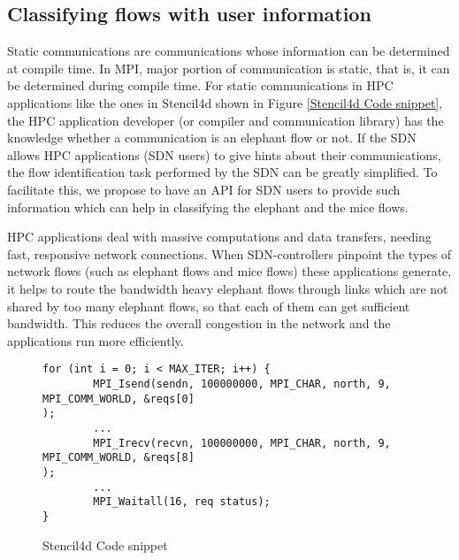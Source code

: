  

\subsection{Classifying flows with user information}
Static communications are communications whose
information can be determined at compile time. In MPI, major portion of
communication is static, that is, it can be determined during compile time. 
For static communications in HPC applications like the ones in Stencil4d 
shown in Figure \ref{Stencil4d Code snippet}, 
the HPC application developer (or compiler and communication library) 
has the knowledge whether a communication is an elephant flow or not. 
If the SDN allows HPC applications (SDN users) to give hints about 
their communications, the flow identification task performed by the 
SDN can be greatly simplified. To facilitate this, we propose to have 
an API for SDN users to provide such information which can help in 
classifying the elephant and the mice flows.
\begin{comment} 
The most complete information about a point-to-point communication i
ncludes the source MPI rank, the destination rank, and the message size. 
Based on the information the users can give the hint when the 
application is loaded (when MPI ranks are mapped to physical nodes).
\end{comment}



HPC applications deal with massive computations and data transfers, 
needing fast, responsive network connections. When SDN-controllers
pinpoint the types of network flows (such as elephant flows and mice flows) 
these applications generate, it helps to route the bandwidth heavy elephant flows
 through links which are not shared by too many elephant flows, so that each
 of them can get sufficient bandwidth. This reduces the overall congestion 
in the network and the applications run more efficiently.


\begin{figure}[hbtp]
\caption{Stencil4d Code snippet}
\label{code.stencil}
\begin{lstlisting}[breaklines]
for (int i = 0; i < MAX_ITER; i++) {
        MPI_Isend(sendn, 100000000, MPI_CHAR, north, 9, MPI_COMM_WORLD, &reqs[0]
);
        ...
        MPI_Irecv(recvn, 100000000, MPI_CHAR, north, 9, MPI_COMM_WORLD, &reqs[8]
);
        ...
        MPI_Waitall(16, req status);
}
\end{lstlisting}
\end{figure}



